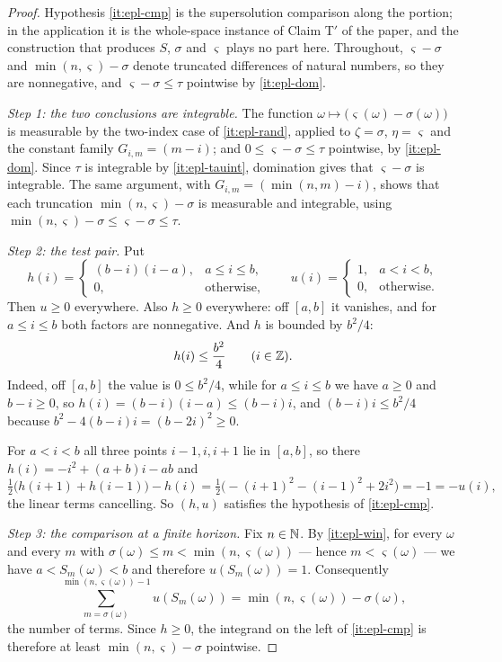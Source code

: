 \begin{proof}
Hypothesis \ref{it:epl-cmp} is the supersolution comparison along the portion;
in the application it is the whole-space instance of Claim T$'$ of the paper,
and the construction that produces $S$, $\sigma$ and $\varsigma$ plays no part
here. Throughout, $\varsigma-\sigma$ and $\min(n,\varsigma)-\sigma$ denote
truncated differences of natural numbers, so they are nonnegative, and
$\varsigma-\sigma\le\tau$ pointwise by \ref{it:epl-dom}.

\emph{Step 1: the two conclusions are integrable.} The function
$\omega\mapsto\bigl(\varsigma(\omega)-\sigma(\omega)\bigr)$ is measurable by
the two-index case of \ref{it:epl-rand}, applied to $\zeta=\sigma$,
$\eta=\varsigma$ and the constant family $G_{i,m}=(m-i)$; and
$0\le\varsigma-\sigma\le\tau$ pointwise, by \ref{it:epl-dom}. Since $\tau$ is
integrable by \ref{it:epl-tauint}, domination gives that $\varsigma-\sigma$ is
integrable. The same argument, with $G_{i,m}=(\min(n,m)-i)$, shows that each
truncation $\min(n,\varsigma)-\sigma$ is measurable and integrable, using
$\min(n,\varsigma)-\sigma\le\varsigma-\sigma\le\tau$.

\emph{Step 2: the test pair.} Put
\[
  h(i)=\begin{cases}(b-i)(i-a),&a\le i\le b,\\ 0,&\text{otherwise},\end{cases}
  \qquad
  u(i)=\begin{cases}1,&a<i<b,\\ 0,&\text{otherwise}.\end{cases}
\]
Then $u\ge0$ everywhere. Also $h\ge0$ everywhere: off $[a,b]$ it vanishes,
and for $a\le i\le b$ both factors are nonnegative. And $h$ is bounded by
$b^2/4$:
\begin{equation}\label{eq:epl-hbd}
  h(i)\le\frac{b^2}{4}\qquad(i\in\mathbb{Z}).
\end{equation}
Indeed, off $[a,b]$ the value is $0\le b^2/4$, while for $a\le i\le b$ we have
$a\ge0$ and $b-i\ge0$, so $h(i)=(b-i)(i-a)\le(b-i)i$, and
$(b-i)i\le b^2/4$ because $b^2-4(b-i)i=(b-2i)^2\ge0$.

For $a<i<b$ all three points $i-1,i,i+1$ lie in $[a,b]$, so there
$h(i)=-i^2+(a+b)i-ab$ and
\[
  \tfrac12\bigl(h(i+1)+h(i-1)\bigr)-h(i)
   =\tfrac12\bigl(-(i+1)^2-(i-1)^2+2i^2\bigr)=-1=-u(i),
\]
the linear terms cancelling. So $(h,u)$ satisfies the hypothesis of
\ref{it:epl-cmp}.

\emph{Step 3: the comparison at a finite horizon.} Fix $n\in\mathbb{N}$. By
\ref{it:epl-win}, for every $\omega$ and every $m$ with
$\sigma(\omega)\le m<\min(n,\varsigma(\omega))$ --- hence
$m<\varsigma(\omega)$ --- we have $a<S_m(\omega)<b$ and therefore
$u(S_m(\omega))=1$. Consequently
\[
  \sum_{m=\sigma(\omega)}^{\min(n,\varsigma(\omega))-1}u(S_m(\omega))
   =\min(n,\varsigma(\omega))-\sigma(\omega),
\]
the number of terms. Since $h\ge0$, the integrand on the left of
\ref{it:epl-cmp} is therefore at least $\min(n,\varsigma)-\sigma$ pointwise.


\end{proof}
